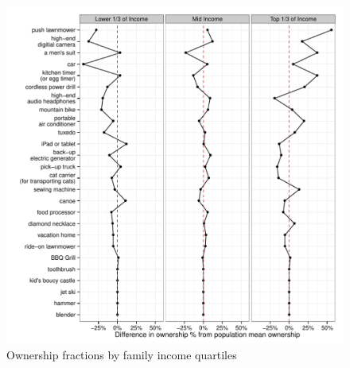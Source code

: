 \documentclass[11pt]{article}
\begin{document}
\begin{figure}
\centering 
\caption{Ownership fractions by family income quartiles}
\begin{minipage}{0.90 \linewidth}
\includegraphics[width = \linewidth]{./plots/ownership_fractions_inc.pdf} 
\end{minipage} 
\end{figure} 




\end{document}
